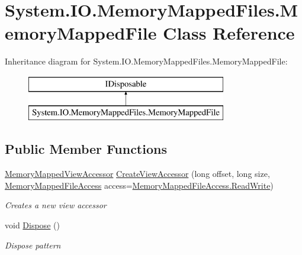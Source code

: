 \hypertarget{class_system_1_1_i_o_1_1_memory_mapped_files_1_1_memory_mapped_file}{}\section{System.\+I\+O.\+Memory\+Mapped\+Files.\+Memory\+Mapped\+File Class Reference}
\label{class_system_1_1_i_o_1_1_memory_mapped_files_1_1_memory_mapped_file}


 


Inheritance diagram for System.\+I\+O.\+Memory\+Mapped\+Files.\+Memory\+Mapped\+File\+:\begin{figure}[H]
\begin{center}
\leavevmode
\includegraphics[height=2.000000cm]{class_system_1_1_i_o_1_1_memory_mapped_files_1_1_memory_mapped_file}
\end{center}
\end{figure}
\subsection*{Public Member Functions}
\begin{DoxyCompactItemize}
\item 
\hyperlink{class_system_1_1_i_o_1_1_memory_mapped_files_1_1_memory_mapped_view_accessor}{Memory\+Mapped\+View\+Accessor} \hyperlink{class_system_1_1_i_o_1_1_memory_mapped_files_1_1_memory_mapped_file_a5072661df52505e95faff64acc0fc026}{Create\+View\+Accessor} (long offset, long size, \hyperlink{namespace_system_1_1_i_o_1_1_memory_mapped_files_a19b0f6344fc0a0d04c0f781e1811c976}{Memory\+Mapped\+File\+Access} access=\hyperlink{namespace_system_1_1_i_o_1_1_memory_mapped_files_a19b0f6344fc0a0d04c0f781e1811c976a70a2a84088d405a2e3f1e3accaa16723}{Memory\+Mapped\+File\+Access.\+Read\+Write})
\begin{DoxyCompactList}\small\item\em Creates a new view accessor \end{DoxyCompactList}\item 
void \hyperlink{class_system_1_1_i_o_1_1_memory_mapped_files_1_1_memory_mapped_file_a9fcaebc20028628bc445531ca99d557e}{Dispose} ()
\begin{DoxyCompactList}\small\item\em Dispose pattern \end{DoxyCompactList}\end{DoxyCompactItemize}
